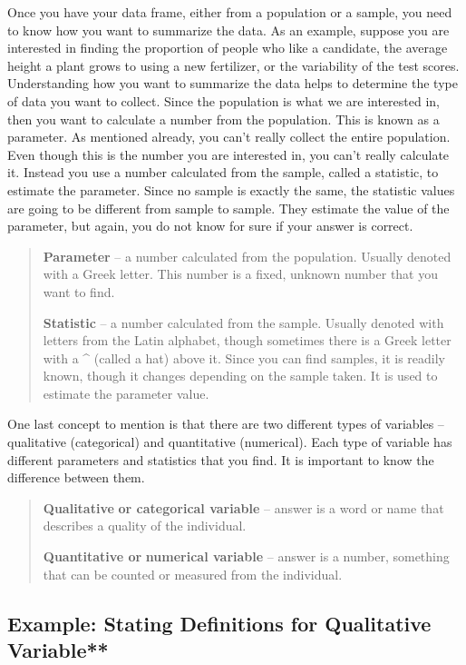 \documentclass[]{book}
\begin{document}
Once you have your data frame, either from a population or a sample, you need to know how you want to summarize the data. As an example, suppose you are interested in finding the proportion of people who like a candidate, the average height a plant grows to using a new fertilizer, or the variability of the test scores. Understanding how you want to summarize the data helps to determine the type of data you want to collect. Since the population is what we are interested in, then you want to calculate a number from the population. This is known as a parameter. As mentioned already, you can't really collect the entire population. Even though this is the number you are interested in, you can't really calculate it. Instead you use a number calculated from the sample, called a statistic, to estimate the parameter. Since no sample is exactly the same, the statistic values are going to be different from sample to sample. They estimate the value of the parameter, but again, you do not know for sure if your answer is correct.

\begin{quote}
\textbf{Parameter} -- a number calculated from the population. Usually denoted with a Greek letter. This number is a fixed, unknown number that you want to find.

\textbf{Statistic} -- a number calculated from the sample. Usually denoted with letters from the Latin alphabet, though sometimes there is a Greek letter with a \^{} (called a hat) above it. Since you can find samples, it is readily known, though it changes depending on the sample taken. It is used to estimate the parameter value.
\end{quote}

One last concept to mention is that there are two different types of variables -- qualitative (categorical) and quantitative (numerical). Each type of variable has different parameters and statistics that you find. It is important to know the difference between them.

\begin{quote}
\textbf{Qualitative} \textbf{or categorical variable} -- answer is a word or name that describes a quality of the individual.

\textbf{Quantitative or} \textbf{numerical variable} -- answer is a number, something that can be counted or measured from the individual.
\end{quote}

\hypertarget{example-stating-definitions-for-qualitative-variable}{%
\subsection{Example: Stating Definitions for Qualitative Variable**}\label{example-stating-definitions-for-qualitative-variable}}
\end{document}

